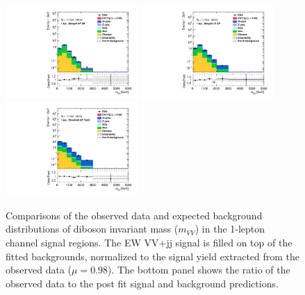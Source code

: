 \begin{figure}[]
    \centering
    \includegraphics[width=0.45\textwidth]{figures/PostFit/Region_distMVV_DSRVBSHP_BMin0_J0_incJet1_L1_T0_incFat1_Y6051_incTag1_Fat1_GlobalFit_unconditionnal_mu1log.pdf}
    \includegraphics[width=0.45\textwidth]{figures/PostFit/Region_distMVV_DSRVBSLP_BMin0_J0_incJet1_L1_T0_incFat1_Y6051_incTag1_Fat1_GlobalFit_unconditionnal_mu1log.pdf}
    \includegraphics[width=0.45\textwidth]{figures/PostFit/Region_distMVV_DSRVBSTight_BMin0_T0_Y6051_incTag1_J2_L1_incJet1_GlobalFit_unconditionnal_mu1log.pdf}
      \caption{Comparisons of the observed data and expected background distributions of diboson invariant mass ($m_{VV}$) in the 1-lepton channel signal regions. The EW VV+jj signal is filled on top of the fitted backgrounds, normalized to the signal yield extracted from the observed data ($\mu = 0.98$). The bottom panel shows the ratio of the observed data to the post fit signal and background predictions.}
      \label{fig:postSR1lepmvv}
\end{figure}
